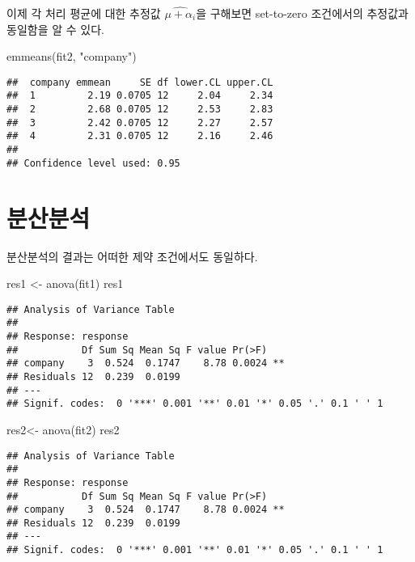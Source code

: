 \documentclass[
]{book}
\newenvironment{Shaded}{\begin{snugshade}}{\end{snugshade}}
\newcommand{\FunctionTok}[1]{\textcolor[rgb]{0.00,0.00,0.00}{#1}}
\newcommand{\NormalTok}[1]{#1}
\newcommand{\OtherTok}[1]{\textcolor[rgb]{0.56,0.35,0.01}{#1}}
\newcommand{\StringTok}[1]{\textcolor[rgb]{0.31,0.60,0.02}{#1}}
\begin{document}
이제 각 처리 평균에 대한 추정값 \(\widehat{\mu+ \alpha_i}\)을 구해보면 set-to-zero 조건에서의 추정값과 동일함을 알 수 있다.

\begin{Shaded}
\begin{Highlighting}[]
\FunctionTok{emmeans}\NormalTok{(fit2, }\StringTok{"company"}\NormalTok{)}
\end{Highlighting}
\end{Shaded}

\begin{verbatim}
##  company emmean     SE df lower.CL upper.CL
##  1         2.19 0.0705 12     2.04     2.34
##  2         2.68 0.0705 12     2.53     2.83
##  3         2.42 0.0705 12     2.27     2.57
##  4         2.31 0.0705 12     2.16     2.46
## 
## Confidence level used: 0.95
\end{verbatim}

\hypertarget{uxbd84uxc0b0uxbd84uxc11d}{%
\section{분산분석}\label{uxbd84uxc0b0uxbd84uxc11d}}

분산분석의 결과는 어떠한 제약 조건에서도 동일하다.

\begin{Shaded}
\begin{Highlighting}[]
\NormalTok{res1 }\OtherTok{\textless{}{-}} \FunctionTok{anova}\NormalTok{(fit1)}
\NormalTok{res1}
\end{Highlighting}
\end{Shaded}

\begin{verbatim}
## Analysis of Variance Table
## 
## Response: response
##           Df Sum Sq Mean Sq F value Pr(>F)   
## company    3  0.524  0.1747    8.78 0.0024 **
## Residuals 12  0.239  0.0199                  
## ---
## Signif. codes:  0 '***' 0.001 '**' 0.01 '*' 0.05 '.' 0.1 ' ' 1
\end{verbatim}

\begin{Shaded}
\begin{Highlighting}[]
\NormalTok{res2}\OtherTok{\textless{}{-}} \FunctionTok{anova}\NormalTok{(fit2)}
\NormalTok{res2}
\end{Highlighting}
\end{Shaded}

\begin{verbatim}
## Analysis of Variance Table
## 
## Response: response
##           Df Sum Sq Mean Sq F value Pr(>F)   
## company    3  0.524  0.1747    8.78 0.0024 **
## Residuals 12  0.239  0.0199                  
## ---
## Signif. codes:  0 '***' 0.001 '**' 0.01 '*' 0.05 '.' 0.1 ' ' 1
\end{verbatim}
\end{document}
